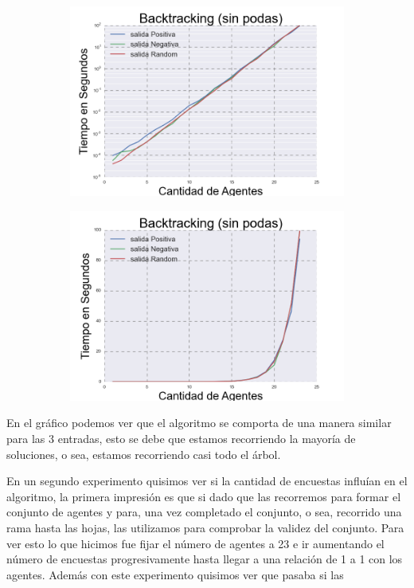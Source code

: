\begin{figure}[h]
\begin{subfigure}{0.5\textwidth}
\includegraphics[scale=0.45]{BacktrackingLog.png}
\end{subfigure}
\begin{subfigure}{0.5\textwidth}
\includegraphics[scale=0.45]{Backtracking.png}
\end{subfigure}
\end{figure}

	En el gráfico podemos ver que el algoritmo se comporta de una manera similar para las 3 entradas, esto se debe que estamos recorriendo la mayoría de soluciones, o sea, estamos recorriendo casi todo el árbol. 
	
	En un segundo experimento quisimos ver si la cantidad de encuestas influían en el algoritmo, la primera impresión es que si dado que las recorremos para formar el conjunto de agentes y para, una vez completado el conjunto, o sea, recorrido una rama hasta las hojas, las utilizamos para comprobar la validez del conjunto. Para ver esto lo que hicimos fue fijar el número de agentes a 23 e ir aumentando el número de encuestas progresivamente hasta llegar a una relación de 1 a 1 con los agentes. Además con este experimento quisimos ver que pasaba si las 
	
